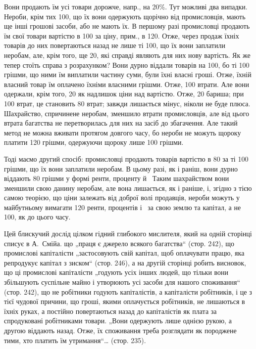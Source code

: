 \parcont{}  %
Вони продають їм усі товари дорожче, напр., на 20\%. Тут можливі два випадки. Нероби, крім
тих 100, що їх вони одержують щорічно від промисловців, мають ще інші грошові засоби, або
не мають їх. В першому разі промисловці продають їм свої товари вартістю в 100 за ціну,
прим., в 120. Отже, через продаж їхніх товарів до них повертаються назад не лише ті 100, що їх вони заплатили неробам, але, крім того, ще 20, які справді являють для них
нову вартість. Як же тепер стоїть справа з розрахунком? Вони дурно віддали товарів на 100,
бо ті 100 грішми, що ними їм виплатили частину суми, були їхні власні гроші. Отже, їхній
власний товар їм оплачено їхніми власними грішми. Отже, 100 втрати. Але вони одержали,
крім того, 20 як надлишок ціни над вартістю. Отже, 20 бариша; при 100
втрат, це становить 80 втрат; завжди лишається мінус, ніколи не буде плюса. Шахрайство,
спричинене неробам, зменшило втрати промисловців, але від цього втрата багатства не перетворилась
для них на засіб до збагачення. Але такий метод не можна вживати протягом довгого часу, бо нероби не
можуть щороку платити 120 грішми, одержуючи щороку лише 100 грішми.

Тоді маємо другий спосіб: промисловці продають товарів вартістю в 80 за ті 100
грішми, що їх вони заплатили неробам. В цьому разі, як і раніш, вони дурно віддають 80
грішми у формі ренти, проценту й~ Таким шахрайством вони зменшили свою данину неробам, але
вона лишається, як і раніше, і, згідно з тією самою теорією, що ціни залежать від доброї волі
продавців, нероби можуть у майбутньому вимагати 120 ренти, процентів і~ за свою
землю та капітал, а не 100, як до цього часу.

Цей блискучий дослід цілком гідний глибокого мислителя, який на одній сторінці списує в А.~Смійа. що
„праця є джерело всякого багатства“ (стор. 242), що промислові капіталісти „застосовують свій
капітал, щоб оплачувати працю, яка репродукує капітал з зиском“ (стор. 246), а на другій сторінці
робить висновок, що ці промислові капіталісти „годують
усіх інших людей, що тільки вони збільшують суспільне майно і утворюють усі засоби для нашого
споживання“ (стор. 242), що не робітники годують капіталістів, а капіталісти робітників, і це з тієї
чудової причини, що гроші, якими оплачується робітників, не лишаються в їхніх руках, а постійно
повертаються назад до капіталістів як плата за спродуковані робітниками товари. „Вони одержують лише
однією рукою, а другою віддають назад. Отже, їх споживання треба розглядати як породжене тими, хто
платить їм утримання“\dots{} (стор. 235).

